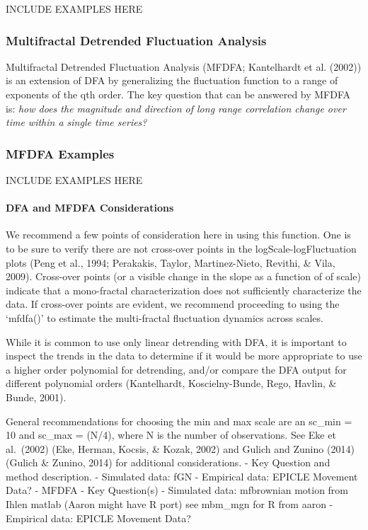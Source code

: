 \documentclass[
  english,
  man]{apa6}
\let\oldparagraph\paragraph
\renewcommand{\paragraph}[1]{\oldparagraph{#1}\mbox{}}
\begin{document}
INCLUDE EXAMPLES HERE

\hypertarget{multifractal-detrended-fluctuation-analysis}{%
\subsubsection{Multifractal Detrended Fluctuation Analysis}\label{multifractal-detrended-fluctuation-analysis}}

Multifractal Detrended Fluctuation Analysis (MFDFA;
Kantelhardt et al. (2002)) is an extension of DFA
by generalizing the fluctuation function to a range of exponents of the
qth order. The key question that can be answered by MFDFA is: \emph{how does
the magnitude and direction of long range correlation change over time
within a single time series?}

\hypertarget{mfdfa-examples}{%
\subsubsection{MFDFA Examples}\label{mfdfa-examples}}

INCLUDE EXAMPLES HERE

\hypertarget{dfa-and-mfdfa-considerations}{%
\paragraph{DFA and MFDFA Considerations}\label{dfa-and-mfdfa-considerations}}

We recommend a few points of consideration here in using this function.
One is to be sure to verify there are not cross-over points in the
logScale-logFluctuation plots (Peng et al., 1994; Perakakis, Taylor, Martinez-Nieto, Revithi, \& Vila, 2009). Cross-over points (or a visible change in the slope as
a function of of scale) indicate that a mono-fractal characterization
does not sufficiently characterize the data. If cross-over points are
evident, we recommend proceeding to using the `mfdfa()' to estimate the
multi-fractal fluctuation dynamics across scales.

While it is common to use only linear detrending with DFA, it is
important to inspect the trends in the data to determine if it would be
more appropriate to use a higher order polynomial for detrending, and/or
compare the DFA output for different polynomial orders
(Kantelhardt, Koscielny-Bunde, Rego, Havlin, \& Bunde, 2001).

General recommendations for choosing the min and max scale are an sc\_min
= 10 and sc\_max = (N/4), where N is the number of observations. See Eke
et al.~(2002) (Eke, Herman, Kocsis, \& Kozak, 2002) and Gulich and
Zunino (2014) (Gulich \& Zunino, 2014) for additional
considerations. - Key Question and method description. - Simulated data:
fGN - Empirical data: EPICLE Movement Data? - MFDFA - Key Question(s) -
Simulated data: mfbrownian motion from Ihlen matlab (Aaron might have R
port) see mbm\_mgn for R from aaron - Empirical data: EPICLE Movement
Data?
\end{document}
